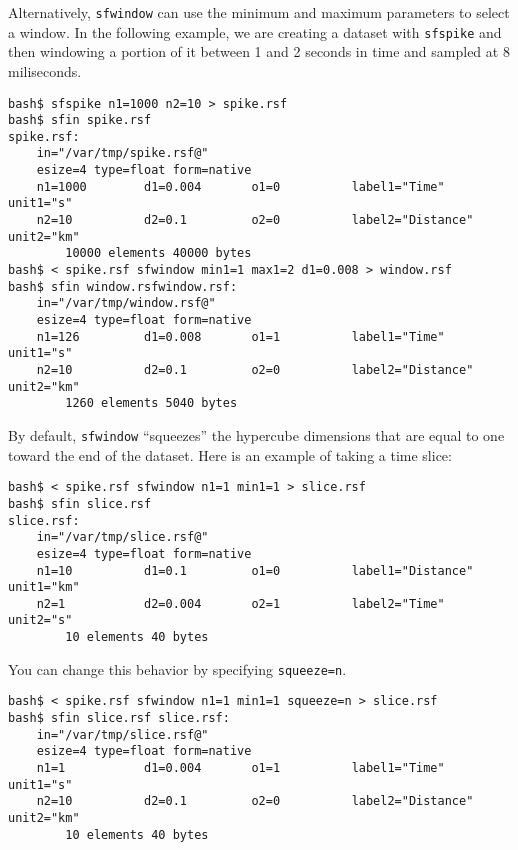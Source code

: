 Alternatively, \texttt{sfwindow} can use the minimum and maximum
parameters to select a window. In the following example, we are
creating a dataset with \texttt{sfspike} and then windowing a portion of it
between 1 and 2 seconds in time and sampled at 8 miliseconds.
\begin{verbatim}
bash$ sfspike n1=1000 n2=10 > spike.rsf         
bash$ sfin spike.rsf
spike.rsf:
    in="/var/tmp/spike.rsf@"
    esize=4 type=float form=native 
    n1=1000        d1=0.004       o1=0          label1="Time" unit1="s" 
    n2=10          d2=0.1         o2=0          label2="Distance" unit2="km" 
        10000 elements 40000 bytes
bash$ < spike.rsf sfwindow min1=1 max1=2 d1=0.008 > window.rsf
bash$ sfin window.rsfwindow.rsf:
    in="/var/tmp/window.rsf@"
    esize=4 type=float form=native 
    n1=126         d1=0.008       o1=1          label1="Time" unit1="s" 
    n2=10          d2=0.1         o2=0          label2="Distance" unit2="km" 
        1260 elements 5040 bytes
\end{verbatim}

By default, \texttt{sfwindow} ``squeezes'' the hypercube dimensions
that are equal to one toward the end of the dataset. Here is an
example of taking a time slice:
\begin{verbatim}
bash$ < spike.rsf sfwindow n1=1 min1=1 > slice.rsf
bash$ sfin slice.rsf 
slice.rsf:
    in="/var/tmp/slice.rsf@"
    esize=4 type=float form=native 
    n1=10          d1=0.1         o1=0          label1="Distance" unit1="km" 
    n2=1           d2=0.004       o2=1          label2="Time" unit2="s" 
        10 elements 40 bytes
\end{verbatim}
You can change this behavior by specifying \texttt{squeeze=n}.
\begin{verbatim}
bash$ < spike.rsf sfwindow n1=1 min1=1 squeeze=n > slice.rsf
bash$ sfin slice.rsf slice.rsf:
    in="/var/tmp/slice.rsf@"
    esize=4 type=float form=native 
    n1=1           d1=0.004       o1=1          label1="Time" unit1="s" 
    n2=10          d2=0.1         o2=0          label2="Distance" unit2="km" 
        10 elements 40 bytes
\end{verbatim}




